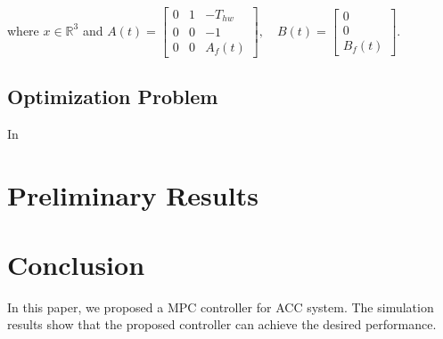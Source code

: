 \documentclass{article}
\numberwithin{equation}{section}
\begin{document}
\noindent where $x \in \mathbb{R}^3$ and $A(t)=\left[\begin{array}{ccc}
            0 & 1 & -T_{h w} \\
            0 & 0 & -1       \\
            0 & 0 & A_{f}(t)
        \end{array}\right], \quad B(t)=\left[\begin{array}{c}
            0 \\
            0 \\
            B_{f}(t)
        \end{array}\right]$.
\subsection{Optimization Problem}

In

\section{Preliminary Results}
\section{Conclusion}

In this paper, we proposed a MPC controller for ACC system. The simulation
results show that the proposed controller can achieve the desired performance.



\end{document}
